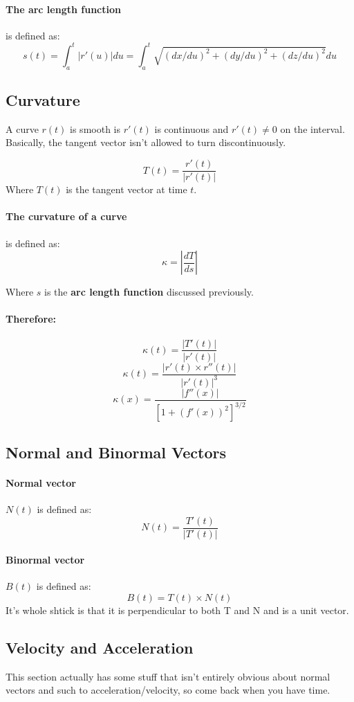 \documentclass[a4paper,12pt]{report}
\begin{document}
\paragraph{The arc length function } is defined as: 
$$s(t) = \int_a^t |r'(u)| du = \int_a^t \sqrt{(dx/du)^2 + (dy/du)^2 + (dz/du)^2} du$$

\subsection{Curvature}
A curve $r(t)$ is smooth is $r'(t)$ is continuous and $r'(t) \neq 0$ on the interval. Basically, the tangent vector isn't allowed to turn discontinuously.

$$T(t) = \frac{r'(t)}{|r'(t)|}$$
Where $T(t)$ is the tangent vector at time $t$. 

\paragraph{The curvature of a curve } is defined as:
$$\kappa = |\frac{dT}{ds}|$$

Where $s$ is the \textbf{arc length function} discussed previously.

\paragraph{Therefore: }
$$\kappa(t) = \frac{|T'(t)|}{|r'(t)|}$$
$$\kappa(t) = \frac{|r'(t) \times r''(t)|}{|r'(t)|^3}$$
$$\kappa(x) = \frac{|f''(x)|}{[1+(f'(x))^2]^{3/2}}$$

\subsection{Normal and Binormal Vectors}
\paragraph{Normal vector } $N(t)$ is defined as: 
$$N(t) = \frac{T'(t)}{|T'(t)|}$$

\paragraph{Binormal vector } $B(t)$ is defined as:
$$B(t) = T(t) \times N(t)$$
It's whole shtick is that it is perpendicular to both T and N and is a unit vector.

\subsection{Velocity and Acceleration}
This section actually has some stuff that isn't entirely obvious about normal vectors and such to acceleration/velocity, so come back when you have time.
\end{document}
